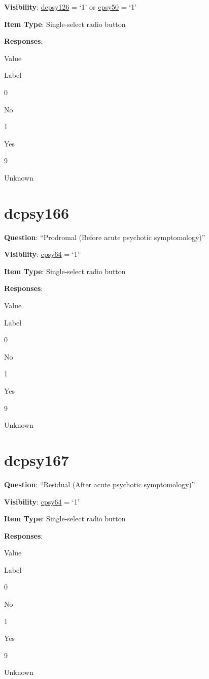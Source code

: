 \documentclass[]{book}
\begin{document}
\textbf{Visibility}: \protect\hyperlink{dcpsy126}{dcpsy126} = `1' or \protect\hyperlink{cpsy50}{cpsy50} = `1'

\textbf{Item Type}: Single-select radio button

\textbf{Responses}:

Value

Label

0

No

1

Yes

9

Unknown

\hypertarget{dcpsy166}{%
\section{dcpsy166}\label{dcpsy166}}

\textbf{Question}: ``Prodromal (Before acute psychotic symptomology)''

\textbf{Visibility}: \protect\hyperlink{cpsy64}{cpsy64} = `1'

\textbf{Item Type}: Single-select radio button

\textbf{Responses}:

Value

Label

0

No

1

Yes

9

Unknown

\hypertarget{dcpsy167}{%
\section{dcpsy167}\label{dcpsy167}}

\textbf{Question}: ``Residual (After acute psychotic symptomology)''

\textbf{Visibility}: \protect\hyperlink{cpsy64}{cpsy64} = `1'

\textbf{Item Type}: Single-select radio button

\textbf{Responses}:

Value

Label

0

No

1

Yes

9

Unknown
\end{document}
